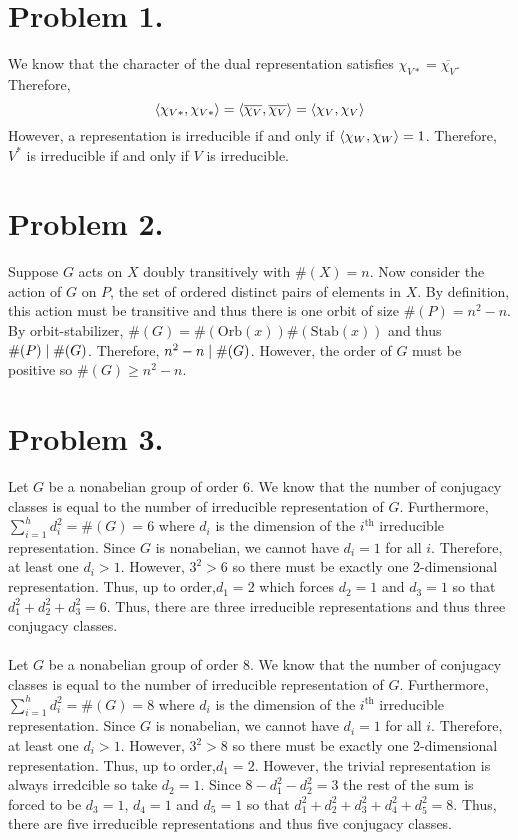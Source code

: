 \documentclass[12pt]{extarticle}
\begin{document}

\section*{Problem 1.}

We know that the character of the dual representation satisfies $\chi_{V*} = \overline{\chi_V}$. Therefore,
\[ \left< \chi_{V*}, \chi_{V*} \right> = \left< \overline{\chi_V}, \overline{\chi_V} \right> = \left< \chi_V, \chi_V \right>\]
However, a representation is irreducible if and only if $\left< \chi_W, \chi_W \right> = 1$. Therefore, $V^*$ is irreducible if and only if $V$ is irreducible. 

\section*{Problem 2.}
Suppose $G$ acts on $X$ doubly transitively with $\#(X) = n$. Now consider the action of $G$ on $P$, the set of ordered distinct pairs of elements in $X$. By definition, this action must be transitive and thus there is one orbit of size $\#(P) = n^2 - n$. By orbit-stabilizer, $\#(G) = \#(\mathrm{Orb}(x)) \#(\mathrm{Stab}(x))$ and thus $\#(P) \mid \#(G)$. Therefore, $n^2 - n \mid \#(G)$. However, the order of $G$ must be positive so $\#(G) \ge n^2 - n$.      

\section*{Problem 3.}
Let $G$ be a nonabelian group of order $6$. We know that the number of conjugacy classes is equal to the number of irreducible representation of $G$. Furthermore, $\sum\limits_{i = 1}^h d_i^2 = \#(G) = 6$ where $d_i$ is the dimension of the $i^\mathrm{th}$ irreducible representation. Since $G$ is nonabelian, we cannot have $d_i = 1$ for all $i$. Therefore, at least one $d_i > 1$. However, $3^2 > 6$ so there must be exactly one 2-dimensional representation. Thus, up to order,$d_1 = 2$ which forces $d_2 = 1$ and $d_3 = 1$ so that $d_1^2 + d_2^2 + d_3^2 = 6$. Thus, there are three irreducible representations and thus three conjugacy classes. 
\bigskip \\
\bigskip \\
Let $G$ be a nonabelian group of order $8$. We know that the number of conjugacy classes is equal to the number of irreducible representation of $G$. Furthermore, $\sum\limits_{i = 1}^h d_i^2 = \#(G) = 8$ where $d_i$ is the dimension of the $i^\mathrm{th}$ irreducible representation. Since $G$ is nonabelian, we cannot have $d_i = 1$ for all $i$. Therefore, at least one $d_i > 1$. However, $3^2 > 8$ so there must be exactly one 2-dimensional representation. Thus, up to order,$d_1 = 2$. However, the trivial representation is always irredcible so take $d_2 = 1$. Since $8 - d_1^2 - d_2^2 = 3$ the rest of the sum is forced to be $d_3 = 1$, $d_4 = 1$ and $d_5 = 1$ so that $d_1^2 + d_2^2 + d_3^2 + d_4^2 + d_5^2 = 8$. Thus, there are five irreducible representations and thus five conjugacy classes. 
\end{document}
